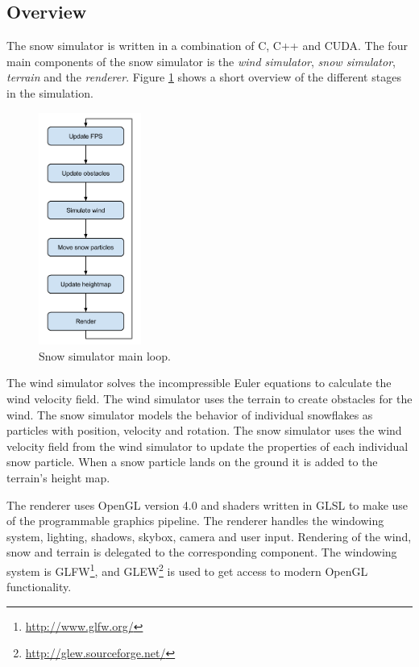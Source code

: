 \subsection{Overview}

The snow simulator is written in a combination of C, C++ and CUDA.
The four main components of the snow simulator is the \emph{wind simulator}, 
\emph{snow simulator}, \emph{terrain} and the \emph{renderer}. Figure \ref{fig:mainLoop} 
shows a short overview of the different stages in the simulation. 

\begin{figure}[ht]
	\center
	\includegraphics[width=0.30\textwidth]{images/snow_sim_main_loop}
	\caption{Snow simulator main loop.}
	\label{fig:mainLoop}
\end{figure}

The wind simulator solves the incompressible Euler equations to calculate the
wind velocity field. The wind simulator uses the terrain to create obstacles for
the wind. The snow simulator models the behavior of individual snowflakes as
particles with position, velocity and rotation. The snow simulator uses the
wind velocity field from the wind simulator to update the properties of each
individual snow particle. When a snow particle lands on the ground it is added
to the terrain's height map.

The renderer uses OpenGL version 4.0 and shaders written in GLSL to make use of 
the programmable graphics pipeline. The renderer handles the windowing system, 
lighting, shadows, skybox, camera and user input. Rendering of the wind, snow and 
terrain is delegated to the corresponding component. The windowing system 
is GLFW\footnote{\url{http://www.glfw.org/}}, and GLEW\footnote{\url{http://glew.sourceforge.net/}} 
is used to get access to modern OpenGL functionality. 
